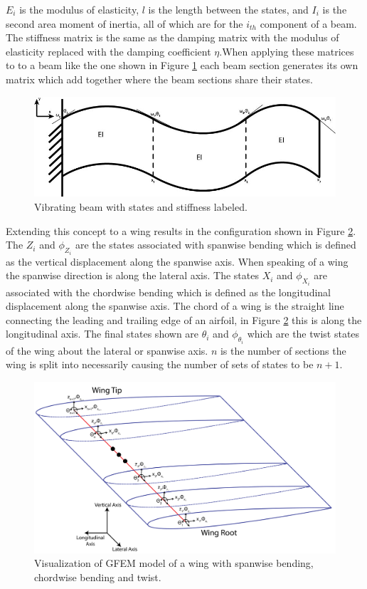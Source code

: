 \documentclass[11pt]{ucthesis}
\begin{document}
$E_i$ is the modulus of elasticity, $l$ is the length between the states, and $I_i$ is the second area moment of inertia, all of which are for the $i_{th}$ component of a beam. The stiffness matrix is the same as the damping matrix with the modulus of elasticity replaced with the damping coefficient $\eta$.When applying these matrices to to a beam like the one shown in Figure \ref{fig:Beam} each beam section generates its own matrix which add together where the beam sections share their states.
\begin{figure}[h]
\centering
\includegraphics[width=.6\linewidth]{Figures/Beam.jpg}
\caption{Vibrating beam with states and stiffness labeled.}
\label{fig:Beam} 
\end{figure}
Extending this concept to a wing results in the configuration shown in Figure \ref{fig:CutWing}. The $Z_i$ and $\phi_{Z_i}$ are the states associated with spanwise bending which is defined as the vertical displacement along the spanwise axis. When speaking of a wing the spanwise direction is along the lateral axis. The states $X_i$ and $\phi_{X_i}$ are associated with the chordwise bending which is defined as the longitudinal displacement along the spanwise axis. The chord of a wing is the straight line connecting the leading and trailing edge of an airfoil, in Figure \ref{fig:CutWing} this is along the longitudinal axis. The final states shown are $\theta_i$ and $\phi_{\theta_i}$ which are the twist states of the wing about the lateral or spanwise axis. $n$ is the number of sections the wing is split into necessarily causing the number of sets of states to be $n+1$.
\begin{figure}[h]
\centering
\includegraphics[width=1\linewidth]{Figures/StructuralWingStates-01.png}
\caption{Visualization of GFEM model of a wing with spanwise bending, chordwise bending and twist.}
\label{fig:CutWing} 
\end{figure}
\end{document}
